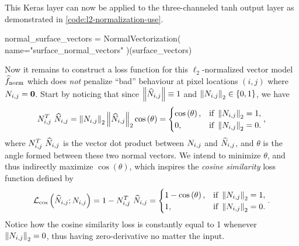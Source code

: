 \noindent
This Keras layer can now be applied to the three-channeled tanh output layer as demonstrated in \cref{code:l2-normalization-use}.
%
\begin{listing}[H]
  \caption{%
    Example usage of the custom \texttt{NormalVectorization} Keras layer.
  }%
  \label{code:l2-normalization-use}
  \begin{pythoncode}
  normal_surface_vectors = NormalVectorization(
      name="surface_normal_vectors"
  )(surface_vectors)
  \end{pythoncode}
\end{listing}

Now it remains to construct a loss function for this $\ell_2$-normalized vector model $\widehat{f}_{\mathrm{norm}}$ which does \emph{not} penalize \enquote{bad} behaviour at pixel locations $(i,j)$ where $N_{i,j} = \boldsymbol{0}$.
Start by noticing that since $\left\lVert\widehat{N}_{i,j}\right\rVert \equiv 1$ and $\left\lVert N_{i,j}\right\rVert_2 \in \{0,1\}$, we have
%
\begin{equation*}
  N_{i,j}^T~\widehat{N}_{i,j}
  =
  \left\lVert N_{i,j}\right\rVert_2
  \left\lVert\widehat{N}_{i,j}\right\rVert_2
  \cos\left(\theta\right)
  =
  \begin{cases}
    \cos\left(\theta\right), &\text{if }\left\lVert N_{i,j}\right\rVert_2 = 1,\\
    0, &\text{if } \left\lVert N_{i,j}\right\rVert_2 = 0.\\
  \end{cases},
\end{equation*}
%
where $N_{i,j}^T~\widehat{N}_{i,j}$ is the vector dot product between $N_{i,j}$ and $\widehat{N}_{i,j}$, and $\theta$ is the angle formed between these two normal vectors.
We intend to minimize $\theta$, and thus indirectly maximize $\cos(\theta)$, which inspires the \textit{cosine similarity} loss function defined by
%
\begin{equation*}
  \mathcal{L}_{\cos}\left(\widehat{N}_{i,j}; N_{i,j}\right)
  =
  1 - N_{i,j}^T~\widehat{N}_{i,j}
  =
  \begin{cases}
    1 - \cos\left(\theta\right), &\text{if }\left\lVert N_{i,j}\right\rVert_2 = 1,\\
    1, &\text{if } \left\lVert N_{i,j}\right\rVert_2 = 0.\\
  \end{cases}.
\end{equation*}
%
Notice how the cosine similarity loss is constantly equal to 1 whenever $\left\lVert N_{i,j}\right\rVert_2 = 0$, thus having zero-derivative no matter the input.
